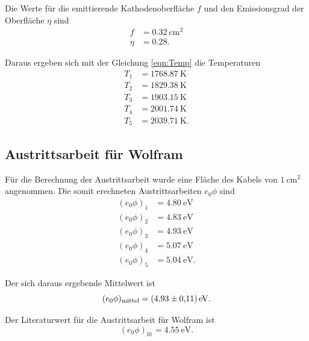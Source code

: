 \noindent Die Werte für die emittierende Kathodenoberfläche $f$ und den
Emissionsgrad der Oberfläche $\eta$ sind
\begin{align*}
    f &= \SI{0.32}{\centi\meter\squared} \\
    \eta &= \num{0.28}.
\end{align*}

\noindent Daraus ergeben sich mit der Gleichung \eqref{eqn:Temp} 
die Temperaturen
\begin{align*}
    T_\text{1} &= \SI{1768.87}{\kelvin} \\
    T_\text{2} &= \SI{1829.38}{\kelvin} \\
    T_\text{3} &= \SI{1903.15}{\kelvin} \\
    T_\text{4} &= \SI{2001.74}{\kelvin} \\
    T_\text{5} &= \SI{2039.71}{\kelvin}.
\end{align*}


\subsection{Austrittsarbeit für Wolfram}
Für die Berechnung der Austrittsarbeit wurde eine Fläche des Kabels von $\SI{1}{\centi\meter\squared}$ angenommen.
Die somit erechneten Austrittsarbeiten $e_0 \phi$ sind
\begin{align*}
    (e_0 \phi)_\text{1} &= \SI{4.80}{\electronvolt} \\
    (e_0 \phi)_\text{2} &= \SI{4.83}{\electronvolt} \\
    (e_0 \phi)_\text{3} &= \SI{4.93}{\electronvolt} \\
    (e_0 \phi)_\text{4} &= \SI{5.07}{\electronvolt} \\
    (e_0 \phi)_\text{5} &= \SI{5.04}{\electronvolt}.
\end{align*}

\noindent Der sich daraus ergebende Mittelwert ist
\begin{equation*}
    (e_0 \phi)_\text{mittel} = \SI{4.93 \pm 0.11}{\electronvolt}.
\end{equation*}

\noindent Der Literaturwert für die Austrittsarbeit für
Wolfram \cite{wiki} ist
\begin{equation*}
    (e_0 \phi)_\text{lit} = \SI{4.55}{\electronvolt}.
\end{equation*}
